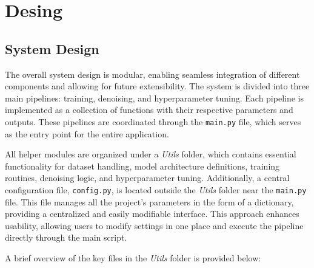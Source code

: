 \graphicspath{{content/chapters/5_design/figures/}}
\chapter{Desing}
\label{chp:design}

\section{System Design}
\label{sec:system_design}

The overall system design is modular, enabling seamless integration of different components and allowing for future extensibility. The system is divided into three main pipelines: training, denoising, and hyperparameter tuning. Each pipeline is implemented as a collection of functions with their respective parameters and outputs. These pipelines are coordinated through the \texttt{main.py} file, which serves as the entry point for the entire application.

All helper modules are organized under a \textit{Utils} folder, which contains essential functionality for dataset handling, model architecture definitions, training routines, denoising logic, and hyperparameter tuning. Additionally, a central configuration file, \texttt{config.py}, is located outside the \textit{Utils} folder near the \texttt{main.py} file. This file manages all the project’s parameters in the form of a dictionary, providing a centralized and easily modifiable interface. This approach enhances usability, allowing users to modify settings in one place and execute the pipeline directly through the main script.

A brief overview of the key files in the \textit{Utils} folder is provided below:

